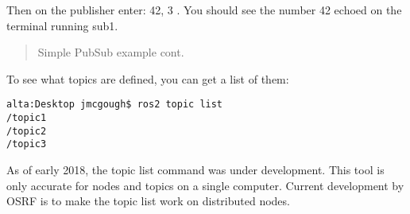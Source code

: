 \begin{Shaded}
\begin{Highlighting}[]

 \OperatorTok{\%}

 \OperatorTok{\%}


\OperatorTok{=}\NormalTok{)}
\OperatorTok{=}\NormalTok{)}
\OperatorTok{=}
\OperatorTok{=}

\end{Highlighting}
\end{Shaded}

Then on the publisher enter: {42, 3} . You should see the number 42
echoed on the terminal running sub1.

\begin{quote}
Simple PubSub example cont.
\end{quote}

To see what topics are defined, you can get a list of them:

\begin{verbatim}
alta:Desktop jmcgough$ ros2 topic list
/topic1
/topic2
/topic3
\end{verbatim}

As of early 2018, the topic list command was under development. This
tool is only accurate for nodes and topics on a single computer. Current
development by OSRF is to make the topic list work on distributed nodes.

